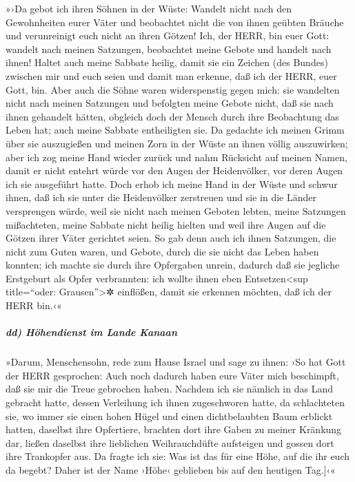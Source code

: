 »›Da gebot ich ihren Söhnen in der Wüste: Wandelt nicht
nach den Gewohnheiten eurer Väter und beobachtet nicht die von ihnen
geübten Bräuche und verunreinigt euch nicht an ihren Götzen!
Ich, der HERR, bin euer Gott: wandelt nach meinen
Satzungen, beobachtet meine Gebote und handelt nach ihnen!
Haltet auch meine Sabbate heilig, damit sie ein Zeichen
(des Bundes) zwischen mir und euch seien und damit man erkenne, daß ich
der HERR, euer Gott, bin. Aber auch die Söhne waren
widerspenstig gegen mich: sie wandelten nicht nach meinen Satzungen und
befolgten meine Gebote nicht, daß sie nach ihnen gehandelt hätten,
obgleich doch der Mensch durch ihre Beobachtung das Leben hat; auch
meine Sabbate entheiligten sie. Da gedachte ich meinen Grimm über sie
auszugießen und meinen Zorn in der Wüste an ihnen völlig auszuwirken;
aber ich zog meine Hand wieder zurück und nahm Rücksicht
auf meinen Namen, damit er nicht entehrt würde vor den Augen der
Heidenvölker, vor deren Augen ich sie ausgeführt hatte.
Doch erhob ich meine Hand in der Wüste und schwur ihnen,
daß ich sie unter die Heidenvölker zerstreuen und sie in die Länder
versprengen würde, weil sie nicht nach meinen Geboten
lebten, meine Satzungen mißachteten, meine Sabbate nicht heilig hielten
und weil ihre Augen auf die Götzen ihrer Väter gerichtet seien.
So gab denn auch ich ihnen Satzungen, die nicht zum Guten
waren, und Gebote, durch die sie nicht das Leben haben konnten;
ich machte sie durch ihre Opfergaben unrein, dadurch daß
sie jegliche Erstgeburt als Opfer verbrannten: ich wollte ihnen eben
Entsetzen\textless sup title=``oder: Grausen''\textgreater✲ einflößen,
damit sie erkennen möchten, daß ich der HERR bin.‹«

\hypertarget{dd-huxf6hendienst-im-lande-kanaan}{%
\subparagraph{dd) Höhendienst im Lande
Kanaan}\label{dd-huxf6hendienst-im-lande-kanaan}}

»Darum, Menschensohn, rede zum Hause Israel und sage zu
ihnen: ›So hat Gott der HERR gesprochen: Auch noch dadurch haben eure
Väter mich beschimpft, daß sie mir die Treue gebrochen haben.
Nachdem ich sie nämlich in das Land gebracht hatte,
dessen Verleihung ich ihnen zugeschworen hatte, da schlachteten sie, wo
immer sie einen hohen Hügel und einen dichtbelaubten Baum erblickt
hatten, daselbst ihre Opfertiere, brachten dort ihre Gaben zu meiner
Kränkung dar, ließen daselbst ihre lieblichen Weihrauchdüfte aufsteigen
und gossen dort ihre Trankopfer aus. \bibleverse{29}{[}Da fragte ich
sie: Was ist das für eine Höhe, auf die ihr euch da begebt? Daher ist
der Name ›Höhe‹ geblieben bis auf den heutigen Tag.{]}‹«

